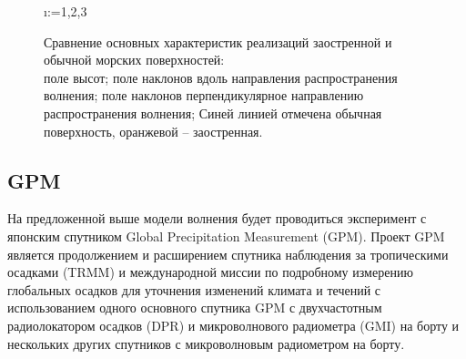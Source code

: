 \begin{figure}[H]
\centering
\makeatletter
    \@for\i:={1,2,3}


\caption{
    Сравнение основных характеристик реализаций заостренной и обычной
    морских поверхностей: \\
     поле высот;
     поле наклонов вдоль направления
    распространения волнения;
     поле наклонов перпендикулярное направлению
    распространения волнения;
    Синей линией отмечена обычная поверхность, оранжевой -- заостренная.
}

\makeatother
\label{fig:cwm_modeling}
\end{figure}



\subsection*{GPM}%
\label{sub:GPM}

На предложенной выше модели волнения будет проводиться эксперимент с японским
спутником Global Precipitation Measurement (GPM). Проект GPM
 является продолжением и расширением
спутника наблюдения за тропическими осадками (TRMM) и
международной миссии по подробному измерению глобальных осадков для
уточнения изменений климата и течений с использованием одного основного
спутника GPM с двухчастотным радиолокатором осадков (DPR) и микроволнового
радиометра (GMI) на борту и нескольких других спутников с микроволновым
радиометром на борту.

